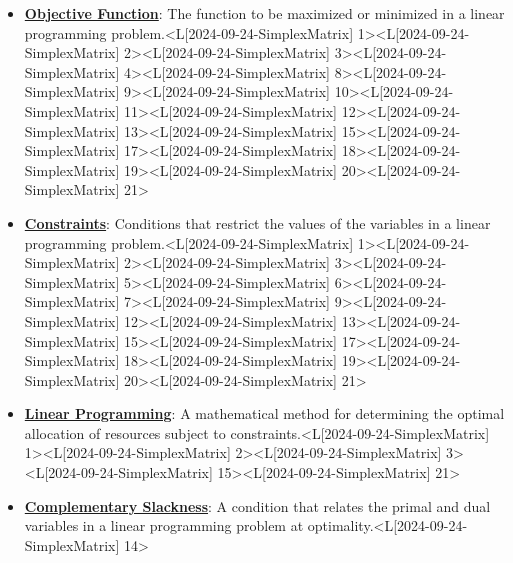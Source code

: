 \documentclass{article}%
\begin{document}
\begin{itemize}[[leftmargin=*]]
\item \href{https://www.math.purdue.edu/~yipn/421/2024-09-24-SimplexMatrix.pdf#page=1}{\textbf{Objective Function}}: The function to be maximized or minimized in a linear programming problem.<L[2024-09-24-SimplexMatrix] 1><L[2024-09-24-SimplexMatrix] 2><L[2024-09-24-SimplexMatrix] 3><L[2024-09-24-SimplexMatrix] 4><L[2024-09-24-SimplexMatrix] 8><L[2024-09-24-SimplexMatrix] 9><L[2024-09-24-SimplexMatrix] 10><L[2024-09-24-SimplexMatrix] 11><L[2024-09-24-SimplexMatrix] 12><L[2024-09-24-SimplexMatrix] 13><L[2024-09-24-SimplexMatrix] 15><L[2024-09-24-SimplexMatrix] 17><L[2024-09-24-SimplexMatrix] 18><L[2024-09-24-SimplexMatrix] 19><L[2024-09-24-SimplexMatrix] 20><L[2024-09-24-SimplexMatrix] 21>%
\item \href{https://www.math.purdue.edu/~yipn/421/2024-09-24-SimplexMatrix.pdf#page=1}{\textbf{Constraints}}: Conditions that restrict the values of the variables in a linear programming problem.<L[2024-09-24-SimplexMatrix] 1><L[2024-09-24-SimplexMatrix] 2><L[2024-09-24-SimplexMatrix] 3><L[2024-09-24-SimplexMatrix] 5><L[2024-09-24-SimplexMatrix] 6><L[2024-09-24-SimplexMatrix] 7><L[2024-09-24-SimplexMatrix] 9><L[2024-09-24-SimplexMatrix] 12><L[2024-09-24-SimplexMatrix] 13><L[2024-09-24-SimplexMatrix] 15><L[2024-09-24-SimplexMatrix] 17><L[2024-09-24-SimplexMatrix] 18><L[2024-09-24-SimplexMatrix] 19><L[2024-09-24-SimplexMatrix] 20><L[2024-09-24-SimplexMatrix] 21>%
\item \href{https://www.math.purdue.edu/~yipn/421/2024-09-24-SimplexMatrix.pdf#page=1}{\textbf{Linear Programming}}: A mathematical method for determining the optimal allocation of resources subject to constraints.<L[2024-09-24-SimplexMatrix] 1><L[2024-09-24-SimplexMatrix] 2><L[2024-09-24-SimplexMatrix] 3><L[2024-09-24-SimplexMatrix] 15><L[2024-09-24-SimplexMatrix] 21>%
\item \href{https://www.math.purdue.edu/~yipn/421/2024-09-24-SimplexMatrix.pdf#page=14}{\textbf{Complementary Slackness}}: A condition that relates the primal and dual variables in a linear programming problem at optimality.<L[2024-09-24-SimplexMatrix] 14>%
\end{itemize}%
\end{document}
